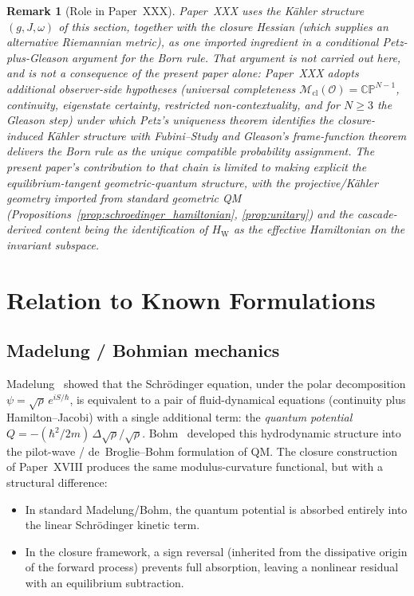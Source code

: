 \documentclass[12pt]{article}
\newtheorem{remark}[theorem]{Remark}
\newcommand{\HW}{H_{\mathrm{W}}}
\newcommand{\Mcl}{\mathcal{M}_{\mathrm{cl}}}
\newcommand{\Ocal}{\mathcal{O}}
\begin{document}
\begin{remark}[Role in Paper~XXX]\label{rem:role_xxx_geo}
Paper~XXX uses the K\"ahler structure $(g, J, \omega)$ of this section, together with the closure Hessian (which supplies an alternative Riemannian metric), as one imported ingredient in a conditional Petz-plus-Gleason argument for the Born rule. That argument is not carried out here, and is not a consequence of the present paper alone: Paper~XXX adopts additional observer-side hypotheses (universal completeness $\Mcl(\Ocal) = \mathbb{CP}^{N-1}$, continuity, eigenstate certainty, restricted non-contextuality, and for $N \geq 3$ the Gleason step) under which Petz's uniqueness theorem identifies the closure-induced K\"ahler structure with Fubini--Study and Gleason's frame-function theorem delivers the Born rule as the unique compatible probability assignment. The present paper's contribution to that chain is limited to making explicit the equilibrium-tangent geometric-quantum structure, with the projective/K\"ahler geometry imported from standard geometric QM (Propositions~\ref{prop:schroedinger_hamiltonian}, \ref{prop:unitary}) and the cascade-derived content being the identification of $\HW$ as the effective Hamiltonian on the invariant subspace.
\end{remark}

\section{Relation to Known Formulations}\label{sec:relation}

\subsection{Madelung / Bohmian mechanics}

Madelung~\citep{Madelung1927} showed that the Schr\"odinger equation, under the polar decomposition $\psi = \sqrt\rho\,e^{iS/\hbar}$, is equivalent to a pair of fluid-dynamical equations (continuity plus Hamilton--Jacobi) with a single additional term: the \emph{quantum potential} $Q = -(\hbar^2/2m)\,\Delta\sqrt\rho/\sqrt\rho$. Bohm~\citep{Bohm1952a,Bohm1952b} developed this hydrodynamic structure into the pilot-wave / de~Broglie--Bohm formulation of QM. The closure construction of Paper~XVIII produces the same modulus-curvature functional, but with a structural difference:
\begin{itemize}
    \item In standard Madelung/Bohm, the quantum potential is absorbed entirely into the linear Schr\"odinger kinetic term.
    \item In the closure framework, a sign reversal (inherited from the dissipative origin of the forward process) prevents full absorption, leaving a nonlinear residual with an equilibrium subtraction.
\end{itemize}
\end{document}
